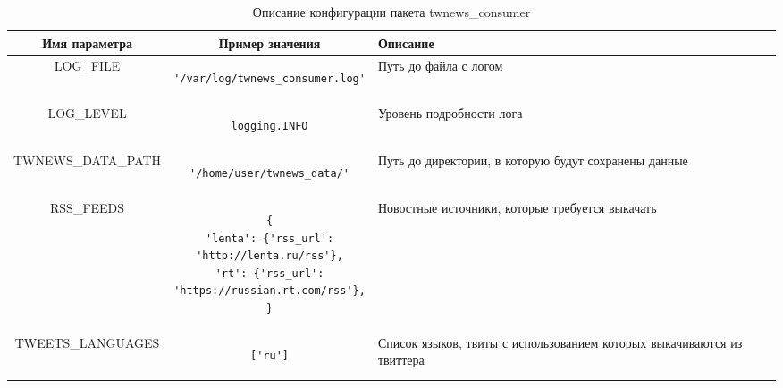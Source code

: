         \begin{table}[h!]
            \small
            \caption{Описание конфигурации пакета twnews\_consumer \bigskip}
            \center

            \label{tabular:consumer_config}
            \begin{tabular}{|c|c|m{4.4cm}|}
                \hline
                \bf{Имя параметра} & \bf{Пример значения} & \bf{Описание} \\ \hline

                LOG\_FILE & \begin{lstlisting}[basicstyle=\small]
'/var/log/twnews_consumer.log'
                \end{lstlisting} & Путь до файла с логом \\ \hline

                LOG\_LEVEL & \begin{lstlisting}[basicstyle=\small]
logging.INFO
                \end{lstlisting} & Уровень подробности лога \\ \hline

                TWNEWS\_DATA\_PATH & \begin{lstlisting}[basicstyle=\small]
'/home/user/twnews_data/'
                \end{lstlisting} & Путь до директории, в которую будут сохранены данные \\ \hline

                RSS\_FEEDS &
                \begin{lstlisting}[basicstyle=\small]
{
'lenta': {'rss_url':
'http://lenta.ru/rss'},
'rt': {'rss_url':
'https://russian.rt.com/rss'},
}
                \end{lstlisting} & Новостные источники, которые требуется выкачать \\ \hline

                TWEETS\_LANGUAGES & \begin{lstlisting}[basicstyle=\small]
['ru']
                \end{lstlisting} & Список языков, твиты с использованием которых выкачиваются из твиттера \\ \hline
            \end{tabular}
        \end{table}

